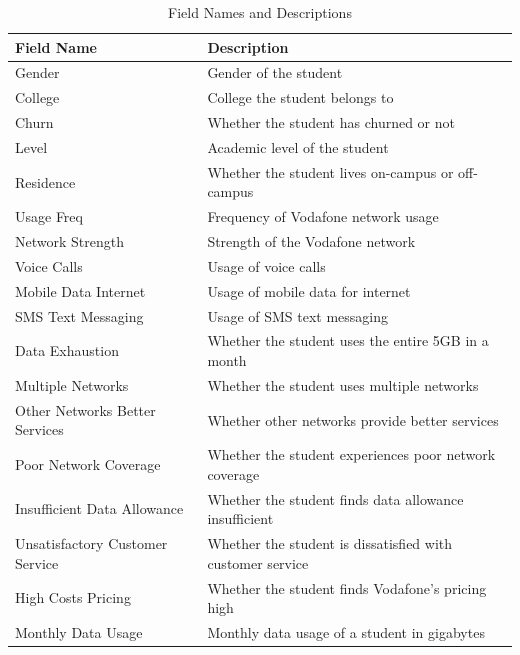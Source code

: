 \documentclass[12pt]{report}
\begin{document}
	\begin{table}[H]
		\centering
		\begin{tabular}{|>{\raggedright\arraybackslash}p{4cm}|p{9cm}|} \hline  
			
			\textbf{Field Name} & \textbf{Description} \\ \hline  
			
			Gender & Gender of the student \\ \hline  
			College & College the student belongs to \\ \hline  
			Churn & Whether the student has churned or not \\ \hline  
			Level & Academic level of the student \\ \hline  
			Residence & Whether the student lives on-campus or off-campus \\ \hline  
			Usage Freq& Frequency of Vodafone network usage \\ \hline  
			Network Strength& Strength of the Vodafone network \\ \hline  
			Voice Calls& Usage of voice calls \\ \hline  
			Mobile Data Internet& Usage of mobile data for internet \\ \hline  
			SMS Text Messaging& Usage of SMS text messaging \\ \hline  
			Data Exhaustion& Whether the student uses the entire 5GB in a month \\ \hline  
			Multiple Networks& Whether the student uses multiple networks \\ \hline  
			Other Networks Better Services& Whether other networks provide better services \\ \hline  
			Poor Network Coverage& Whether the student experiences poor network coverage \\ \hline  
			Insufficient Data Allowance& Whether the student finds data allowance insufficient \\ \hline  
			Unsatisfactory Customer Service& Whether the student is dissatisfied with customer service \\ \hline  
			High Costs Pricing& Whether the student finds Vodafone's pricing high \\ \hline  
			Monthly Data Usage& Monthly data usage of a student in gigabytes \\ \hline 
			
		\end{tabular}
		\caption{Field Names and Descriptions}
	\end{table}
	
\end{document}
